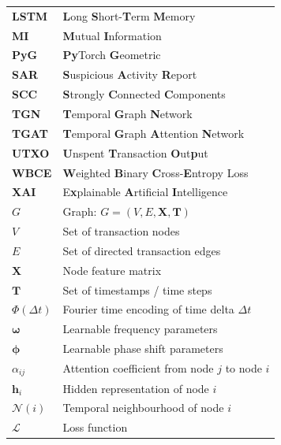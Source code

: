 \begin{glossarylist}
\begin{longtable}{@{} l p{9.2cm} @{}}
\textbf{LSTM} & \textbf{L}ong \textbf{S}hort-\textbf{T}erm \textbf{M}emory \\
\textbf{MI} & \textbf{M}utual \textbf{I}nformation \\
\textbf{PyG} & \textbf{Py}Torch \textbf{G}eometric \\
\textbf{SAR} & \textbf{S}uspicious \textbf{A}ctivity \textbf{R}eport \\
\textbf{SCC} & \textbf{S}trongly \textbf{C}onnected \textbf{C}omponents \\
\textbf{TGN} & \textbf{T}emporal \textbf{G}raph \textbf{N}etwork \\
\textbf{TGAT} & \textbf{T}emporal \textbf{G}raph \textbf{A}ttention \textbf{N}etwork \\
\textbf{UTXO} & \textbf{U}nspent \textbf{T}ransaction \textbf{O}ut\textbf{p}ut \\
\textbf{WBCE} & \textbf{W}eighted \textbf{B}inary \textbf{C}ross-\textbf{E}ntropy Loss \\
\textbf{XAI} & E\textbf{x}plainable \textbf{A}rtificial \textbf{I}ntelligence \\
\midrule
$G$ & Graph: $G = (V, E, \mathbf{X}, \mathbf{T})$ \\
$V$ & Set of transaction nodes \\
$E$ & Set of directed transaction edges \\
$\mathbf{X}$ & Node feature matrix \\
$\mathbf{T}$ & Set of timestamps / time steps \\
$\Phi(\Delta t)$ & Fourier time encoding of time delta $\Delta t$ \\
$\boldsymbol{\omega}$ & Learnable frequency parameters \\
$\boldsymbol{\phi}$ & Learnable phase shift parameters \\
$\alpha_{ij}$ & Attention coefficient from node $j$ to node $i$ \\
$\mathbf{h}_i$ & Hidden representation of node $i$ \\
$\mathcal{N}(i)$ & Temporal neighbourhood of node $i$ \\
$\mathcal{L}$ & Loss function \\
\end{longtable}

\end{glossarylist}
